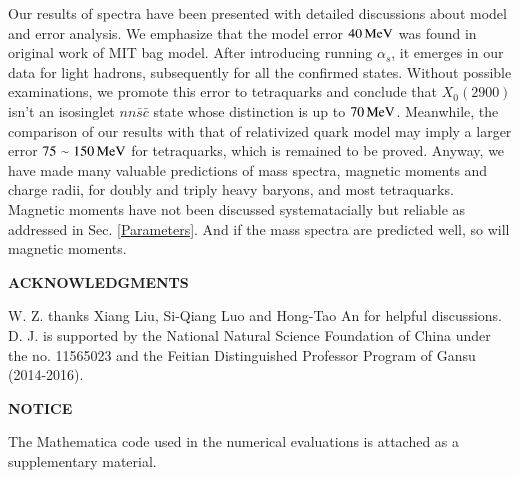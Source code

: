 \documentclass[prd,twocolumn,floatfix,nofootinbib]{revtex4}
\begin{document}
Our results of spectra have been presented with detailed discussions about model and error analysis. 
We emphasize that the model error $40\,{\rm MeV}$ was found in original work of MIT bag model. 
After introducing running $\alpha_{s}$, it emerges in our data for light hadrons, subsequently for all the confirmed states. 
Without possible examinations, we promote this error to tetraquarks and conclude that $X_{0}(2900)$ isn't an isosinglet $nn\bar{s}\bar{c}$ state whose distinction is up to $70\,{\rm MeV}$.
Meanwhile, the comparison of our results with that of relativized quark model may imply a larger error $75\sim 150\,{\rm MeV}$ for tetraquarks, which is remained to be proved.
Anyway, we have made many valuable predictions of mass spectra, magnetic moments and charge radii, for doubly and triply heavy baryons, and most tetraquarks. 
Magnetic moments have not been discussed systematacially but reliable as addressed in Sec. \ref{Parameters}.
And if the mass spectra are predicted well, so will magnetic moments.


\medskip
\textbf{ACKNOWLEDGMENTS}

W. Z. thanks Xiang Liu, Si-Qiang Luo and Hong-Tao An for helpful discussions. 
D. J. is supported by the National Natural Science Foundation of China under the no. 11565023 and
the Feitian Distinguished Professor Program of Gansu (2014-2016).

\medskip
\textbf{NOTICE}

The Mathematica code used in the numerical evaluations is attached as a supplementary material.


\medskip
\end{document}
